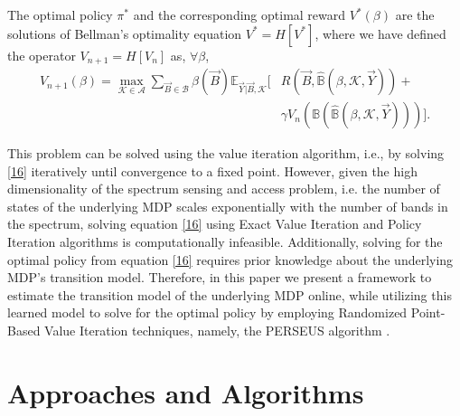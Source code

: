 \documentclass[10pt,twocolumn]{IEEEtran}
\begin{document}
The optimal policy $\pi^*$ and the corresponding optimal reward $V^*(\beta)$ are the solutions of Bellman's optimality equation $V^*=H[V^*]$, where we have defined the operator $V_{n+1}=H[V_n]$ as, $\forall \beta$,
\begin{equation}\label{16}
    \begin{aligned}
        V_{n+1}(\beta) = \max_{\mathcal{K} \in \mathcal{A}} \sum_{\vec{B} \in \mathcal{B}} \beta(\vec{B}) \mathbb{E}_{\vec{Y}|\vec{B}, \mathcal{K}} \Big[&R(\vec{B}, \hat{\mathbb{B}}(\beta, \mathcal{K}, \vec{Y})) +\\ &\gamma V_n(\mathbb{B}(\hat{\mathbb{B}}(\beta, \mathcal{K}, \vec{Y})))\Big].
    \end{aligned}
\end{equation}

This problem can be solved using the value iteration algorithm, i.e., by solving \eqref{16} iteratively until convergence to a fixed point. However, given the high dimensionality of the spectrum sensing and access problem, i.e. the number of states of the underlying MDP scales exponentially with the number of bands in the spectrum, solving equation \eqref{16} using Exact Value Iteration and Policy Iteration algorithms is computationally infeasible. Additionally, solving for the optimal policy from equation \eqref{16} requires prior knowledge about the underlying MDP's transition model. Therefore, in this paper we present a framework to estimate the transition model of the underlying MDP online, while utilizing this learned model to solve for the optimal policy by employing Randomized Point-Based Value Iteration techniques, namely, the PERSEUS algorithm \cite{DBLP:journals/corr/abs-1109-2145}.
\section{Approaches and Algorithms}\label{III}
\end{document}
